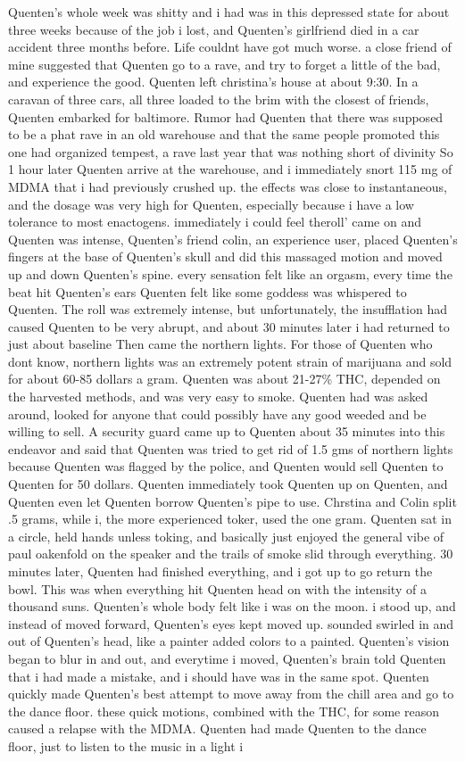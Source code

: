 \documentclass[12pt]{book}
\begin{document}
Quenten's whole week was shitty and i had was in this depressed state for about three weeks because of the job i lost, and Quenten's girlfriend died in a car accident three months before. Life couldnt have got much worse. a close friend of mine suggested that Quenten go to a rave, and try to forget a little of the bad, and experience the good. Quenten left christina's house at about 9:30. In a caravan of three cars, all three loaded to the brim with the closest of friends, Quenten embarked for baltimore. Rumor had Quenten that there was supposed to be a phat rave in an old warehouse and that the same people promoted this one had organized tempest, a rave last year that was nothing short of divinity So 1 hour later Quenten arrive at the warehouse, and i immediately snort 115 mg of MDMA that i had previously crushed up. the effects was close to instantaneous, and the dosage was very high for Quenten, especially because i have a low tolerance to most enactogens. immediately i could feel theroll' came on and Quenten was intense, Quenten's friend colin, an experience user, placed Quenten's fingers at the base of Quenten's skull and did this massaged motion and moved up and down Quenten's spine. every sensation felt like an orgasm, every time the beat hit Quenten's ears Quenten felt like some goddess was whispered to Quenten. The roll was extremely intense, but unfortunately, the insufflation had caused Quenten to be very abrupt, and about 30 minutes later i had returned to just about baseline Then came the northern lights. For those of Quenten who dont know, northern lights was an extremely potent strain of marijuana and sold for about 60-85 dollars a gram. Quenten was about 21-27\% THC, depended on the harvested methods, and was very easy to smoke. Quenten had was asked around, looked for anyone that could possibly have any good weeded and be willing to sell. A security guard came up to Quenten about 35 minutes into this endeavor and said that Quenten was tried to get rid of 1.5 gms of northern lights because Quenten was flagged by the police, and Quenten would sell Quenten to Quenten for 50 dollars. Quenten immediately took Quenten up on Quenten, and Quenten even let Quenten borrow Quenten's pipe to use. Chrstina and Colin split .5 grams, while i, the more experienced toker, used the one gram. Quenten sat in a circle, held hands unless toking, and basically just enjoyed the general vibe of paul oakenfold on the speaker and the trails of smoke slid through everything. 30 minutes later, Quenten had finished everything, and i got up to go return the bowl. This was when everything hit Quenten head on with the intensity of a thousand suns. Quenten's whole body felt like i was on the moon. i stood up, and instead of moved forward, Quenten's eyes kept moved up. sounded swirled in and out of Quenten's head, like a painter added colors to a painted. Quenten's vision began to blur in and out, and everytime i moved, Quenten's brain told Quenten that i had made a mistake, and i should have was in the same spot. Quenten quickly made Quenten's best attempt to move away from the chill area and go to the dance floor. these quick motions, combined with the THC, for some reason caused a relapse with the MDMA. Quenten had made Quenten to the dance floor, just to listen to the music in a light i 
\end{document}
